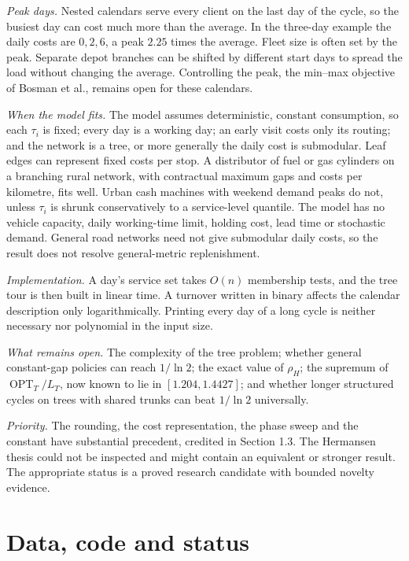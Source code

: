 \documentclass[
  british,
  11pt,
  a4paper,
]{article}
\begin{document}
\emph{Peak days.} Nested calendars serve every client on the last day of
the cycle, so the busiest day can cost much more than the average. In
the three-day example the daily costs are \(0,2,6\), a peak \(2.25\)
times the average. Fleet size is often set by the peak. Separate depot
branches can be shifted by different start days to spread the load
without changing the average. Controlling the peak, the min--max
objective of Bosman et al., remains open for these calendars.

\emph{When the model fits.} The model assumes deterministic, constant
consumption, so each \(\tau_i\) is fixed; every day is a working day; an
early visit costs only its routing; and the network is a tree, or more
generally the daily cost is submodular. Leaf edges can represent fixed
costs per stop. A distributor of fuel or gas cylinders on a branching
rural network, with contractual maximum gaps and costs per kilometre,
fits well. Urban cash machines with weekend demand peaks do not, unless
\(\tau_i\) is shrunk conservatively to a service-level quantile. The
model has no vehicle capacity, daily working-time limit, holding cost,
lead time or stochastic demand. General road networks need not give
submodular daily costs, so the result does not resolve general-metric
replenishment.

\emph{Implementation.} A day's service set takes \(O(n)\) membership
tests, and the tree tour is then built in linear time. A turnover
written in binary affects the calendar description only logarithmically.
Printing every day of a long cycle is neither necessary nor polynomial
in the input size.

\emph{What remains open.} The complexity of the tree problem; whether
general constant-gap policies can reach \(1/\ln2\); the exact value of
\(\rho_H\); the supremum of \(\operatorname{OPT}_T/L_T\), now known to
lie in \([1.204,1.4427]\); and whether longer structured cycles on trees
with shared trunks can beat \(1/\ln2\) universally.

\emph{Priority.} The rounding, the cost representation, the phase sweep
and the constant have substantial precedent, credited in Section 1.3.
The Hermansen thesis could not be inspected and might contain an
equivalent or stronger result. The appropriate status is a proved
research candidate with bounded novelty evidence.

\section{Data, code and status}\label{data-code-and-status}
\end{document}
